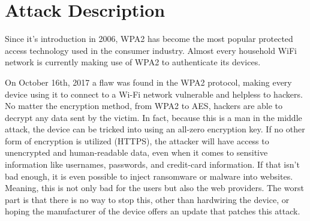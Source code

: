 \documentclass{article}
\begin{document}


\begin{abstract} 
{\bf Bringing awareness to new attacks that expose the majority of WiFi
networks.} This proposal discusses the importance of recent attacks executed on the
WPA2 protocol and proposes the creation of a mobile application that can
showcase and exploit wireless APs. \end{abstract} 


\section{Attack Description}\label{attack-description}

Since it's introduction in 2006, WPA2 has become the most popular
protected access technology used in the consumer industry. Almost every
household WiFi network is currently making use of WPA2 to authenticate
its devices.

On October 16th, 2017 a flaw was found in the WPA2 protocol, making
every device using it to connect to a Wi-Fi network vulnerable and
helpless to hackers. No matter the encryption method, from WPA2 to AES,
hackers are able to decrypt any data sent by the victim. In fact,
because this is a man in the middle attack, the device can be tricked
into using an all-zero encryption key. If no other form of encryption is
utilized (HTTPS), the attacker will have access to unencrypted and
human-readable data, even when it comes to sensitive information like
usernames, passwords, and credit-card information. If that isn't bad
enough, it is even possible to inject ransomware or malware into
websites. Meaning, this is not only bad for the users but also the web
providers. The worst part is that there is no way to stop this, other
than hardwiring the device, or hoping the manufacturer of the device
offers an update that patches this attack. \citet{KrackAttacks}
\end{document}
